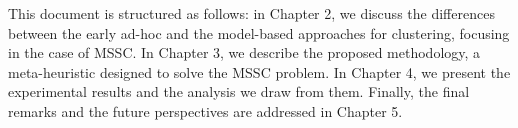 This document is structured as follows: in Chapter 2, we discuss the differences between the early ad-hoc and the model-based approaches for clustering, focusing in the case of MSSC. In Chapter 3, we describe the proposed methodology, a meta-heuristic designed to solve the MSSC problem. In Chapter 4, we present the experimental results and the analysis we draw from them. Finally, the final remarks and the future perspectives are addressed in Chapter 5.